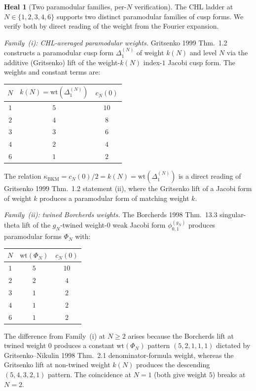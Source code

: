\documentclass[11pt]{article}
\theoremstyle{definition}
\newtheorem{heal}[theorem]{Heal}
\newcommand{\kBKM}{\kappa_{\mathrm{BKM}}}
\begin{document}
\begin{heal}[Two paramodular families, per-$N$ verification]
The CHL ladder at $N \in \{1, 2, 3, 4, 6\}$ supports two distinct
paramodular families of cusp forms. We verify both by direct reading
of the weight from the Fourier expansion.

\emph{Family~(i): CHL-averaged paramodular weights.} Gritsenko 1999
Thm.~1.2 constructs a paramodular cusp form $\Delta_1^{(N)}$ of weight
$k(N)$ and level $N$ via the additive (Gritsenko) lift of the
weight-$k(N)$ index-$1$ Jacobi cusp form. The weights and constant
terms are:
\begin{center}
\begin{tabular}{c|cc}
$N$ & $k(N) = \mathrm{wt}(\Delta_1^{(N)})$ & $c_N(0)$ \\ \hline
$1$ & $5$ & $10$ \\
$2$ & $4$ & $8$ \\
$3$ & $3$ & $6$ \\
$4$ & $2$ & $4$ \\
$6$ & $1$ & $2$
\end{tabular}
\end{center}
The relation $\kBKM = c_N(0)/2 = k(N) = \mathrm{wt}(\Delta_1^{(N)})$ is a
direct reading of Gritsenko 1999 Thm.~1.2 statement (ii), where the
Gritsenko lift of a Jacobi form of weight $k$ produces a paramodular
form of matching weight $k$.

\emph{Family~(ii): twined Borcherds weights.} The Borcherds 1998 Thm.~13.3
singular-theta lift of the $g_N$-twined weight-$0$ weak Jacobi form
$\phi^{(g_N)}_{0,1}$ produces paramodular forms $\Phi_N$ with:
\begin{center}
\begin{tabular}{c|cc}
$N$ & $\mathrm{wt}(\Phi_N)$ & $c_N(0)$ \\ \hline
$1$ & $5$ & $10$ \\
$2$ & $2$ & $4$ \\
$3$ & $1$ & $2$ \\
$4$ & $1$ & $2$ \\
$6$ & $1$ & $2$
\end{tabular}
\end{center}
The difference from Family~(i) at $N \geq 2$ arises because the
Borcherds lift at twined weight $0$ produces a constant $\mathrm{wt}(\Phi_N)$
pattern $(5, 2, 1, 1, 1)$ dictated by Gritsenko--Nikulin 1998 Thm.~2.1
denominator-formula weight, whereas the Gritsenko lift at non-twined
weight $k(N)$ produces the descending $(5, 4, 3, 2, 1)$ pattern. The
coincidence at $N = 1$ (both give weight $5$) breaks at $N = 2$.


\end{heal}
\end{document}
